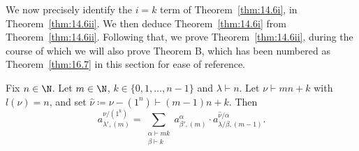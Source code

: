 We now precisely identify the $i=k$ term of Theorem~\ref{thm:14.6i}, in Theorem~\ref{thm:14.6ii}. We then deduce Theorem~\ref{thm:14.6i} from Theorem~\ref{thm:14.6ii}. Following that, we prove Theorem~\ref{thm:14.6ii}, during the course of which we will also prove Theorem B, which has been numbered as Theorem~\ref{thm:16.7} in this section for ease of reference.

\begin{theorem}\label{thm:14.6ii}
	Fix $n\in\N$. Let $m\in\N$, $k\in\{0,1,\dotsc,n-1\}$ and $\lambda\vdash n$. Let $\nu\vdash mn+k$ with $l(\nu)=n$, and set $\hat{\nu}\coloneqq \nu-(1^n)\vdash (m-1)n+k$. Then
	\[ a^{\nu/(1^k)}_{\lambda',(m)} = \sum_{\substack{\alpha\vdash mk\\\beta\vdash k}} a^\alpha_{\beta',(m)}\cdot a^{\hat{\nu}/\alpha}_{\lambda/\beta,(m-1)}. \]
\end{theorem}

